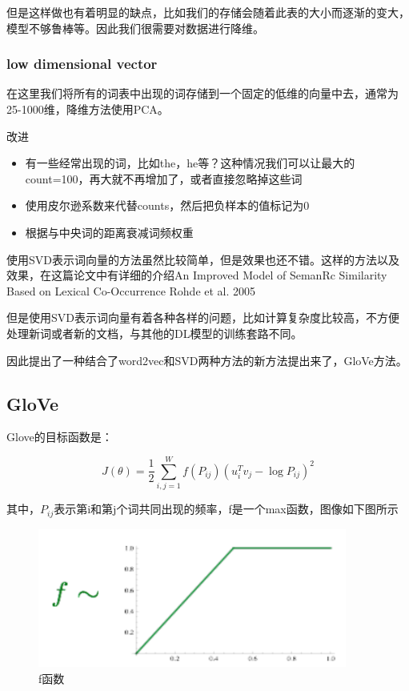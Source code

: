 	但是这样做也有着明显的缺点，比如我们的存储会随着此表的大小而逐渐的变大，模型不够鲁棒等。因此我们很需要对数据进行降维。
	
	\subsubsection{low dimensional vector}
	
	在这里我们将所有的词表中出现的词存储到一个固定的低维的向量中去，通常为25-1000维，降维方法使用PCA。
	
	改进
	
	\begin{itemize}
		\item 有一些经常出现的词，比如the，he等？这种情况我们可以让最大的count=100，再大就不再增加了，或者直接忽略掉这些词	
		\item  使用皮尔逊系数来代替counts，然后把负样本的值标记为0
		\item 根据与中央词的距离衰减词频权重
	\end{itemize}
	
	使用SVD表示词向量的方法虽然比较简单，但是效果也还不错。这样的方法以及效果，在这篇论文中有详细的介绍An	Improved Model of SemanRc Similarity Based on Lexical	Co-Occurrence Rohde	et al. 2005
	
	但是使用SVD表示词向量有着各种各样的问题，比如计算复杂度比较高，不方便处理新词或者新的文档，与其他的DL模型的训练套路不同。
	
	因此提出了一种结合了word2vec和SVD两种方法的新方法提出来了，GloVe方法。
	
	
	\subsection{GloVe}
	
	Glove的目标函数是：
	
	\begin{equation}
	J(\theta) = \frac{1}{2} \sum_{i,j=1}^{W} f(P_{ij})(u_i^Tv_j-\log P_{ij})^2
	\end{equation}
	
	其中，$P_{ij}$表示第i和第j个词共同出现的频率，f是一个max函数，图像如下图所示
	
	
	\begin{figure}[!htbp]
	\centering\includegraphics[width=4in]{img/6-10.png}
	\caption{f函数}\label{fig:6-10}
	\end{figure}
	
